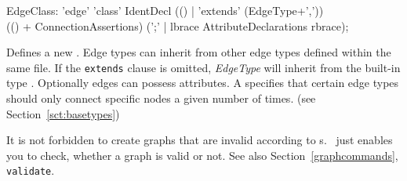 \begin{rail}    
  EdgeClass: 'edge' 'class' IdentDecl (() | 'extends' (EdgeType+',')) \\
    (() + ConnectionAssertions) (';' | lbrace AttributeDeclarations rbrace);
\end{rail}
Defines a new .
Edge types can inherit from other edge types defined within the same file.
If the \texttt{extends} clause is omitted, \emph{EdgeType} will inherit from the built-in type \texttt{}.
Optionally edges can possess attributes.
A  specifies that certain edge types should only connect specific nodes a given number of times.
(see Section~\ref{sct:basetypes})

\begin{note}
It is not forbidden to create graphs that are invalid according to s.
\GrG\ just enables you to check, whether a graph is valid or not.
See also Section~\ref{graphcommands}, \texttt{validate}.
\end{note}

